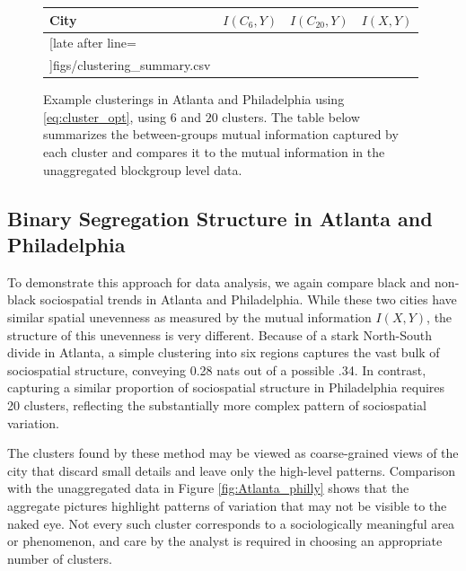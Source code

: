 \documentclass[english]{scrartcl}
\begin{document}
\begin{figure}
		\centering
		\begin{tabular}{l | c c c}
			\bfseries City  & $I(C_6, Y)$ & $I(C_{20},Y)$ & $I(X,Y)$ \\\hline
			\csvreader[late after line=\\]{figs/clustering_summary.csv}{}
			{\csvcoli & \csvcoliii & \csvcoliv & \csvcolii}
		\end{tabular}
		\caption{Example clusterings in Atlanta and Philadelphia using \eqref{eq:cluster_opt}, using $6$ and $20$ clusters. The table below summarizes the between-groups mutual information captured by each cluster and compares it to the mutual information in the unaggregated blockgroup level data.}

	\end{figure}

	\subsection{Binary Segregation Structure in Atlanta and Philadelphia}
		To demonstrate this approach for data analysis, we again compare black and non-black sociospatial trends in Atlanta and Philadelphia. While these two cities have similar spatial unevenness as measured by the mutual information $I(X,Y)$, the structure of this unevenness is very different. Because of a stark North-South divide in Atlanta, a simple clustering into six regions captures the vast bulk of sociospatial structure, conveying 0.28 nats out of a possible .34. In contrast, capturing a similar proportion of sociospatial structure in Philadelphia requires 20 clusters, reflecting the substantially more complex pattern of sociospatial variation. 

		The clusters found by these method may be viewed as coarse-grained views of the city that discard small details and leave only the high-level patterns. Comparison with the unaggregated data in Figure \ref{fig:Atlanta_philly} shows that the aggregate pictures highlight patterns of variation that may not be visible to the naked eye. Not every such cluster corresponds to a sociologically meaningful area or phenomenon, and care by the analyst is required in choosing an appropriate number of clusters. 
\end{document}
